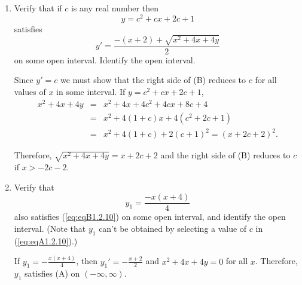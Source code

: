 \documentclass{ximera}
\begin{document}
\begin{problem}\label{exer:1.2.10}
\begin{enumerate}
\item %
Verify that if $c$ is any real number then
\begin{equation}\label{eq:eqA1.2.10}
y=c^2+cx+2c+1
\end{equation}
satisfies
\begin{equation}\label{eq:eqB1.2.10}
 y'=\frac{-(x+2)+\sqrt{x^2+4x+4y}}{2}
\end{equation}
on some open interval. Identify the open interval.



\begin{solution}
    Since $y'=c$ we must show that the right side of
(B)  reduces to $c$ for all values of $x$
in some interval. If $y=c^2+cx+2c+1$,
\begin{eqnarray*}
x^2+4x+4y&=&x^2+4x+4c^2+4cx+8c+4\\
&=&x^2+4(1+c)x+4(c^2+2c+1)\\
&=&x^2+4(1+c)+2(c+1)^2=(x+2c+2)^2.
\end{eqnarray*}

Therefore, $\sqrt{x^2+4x+4y}=x+2c+2$ and the right side of
(B) reduces to $c$ if
$x>-2c-2$.
\end{solution}

\item %
Verify that
$$
y_1=\frac{-x(x+4)}{4}
$$
also satisfies  (\ref{eq:eqB1.2.10}) on some open interval, and
identify the open interval. (Note that $y_1$ can't be obtained
by selecting a value of $c$ in (\ref{eq:eqA1.2.10}).)



\begin{solution}
    If $y_1=-\frac{x(x+4)}{4}$, then $y_1'=-\frac{x+2}{2}$
and $x^2+4x+4y=0$ for all $x$. Therefore, $y_1$ satisfies
(A) on $(-\infty,\infty)$.
\end{solution}
\end{enumerate}
\end{problem}
\end{document}
